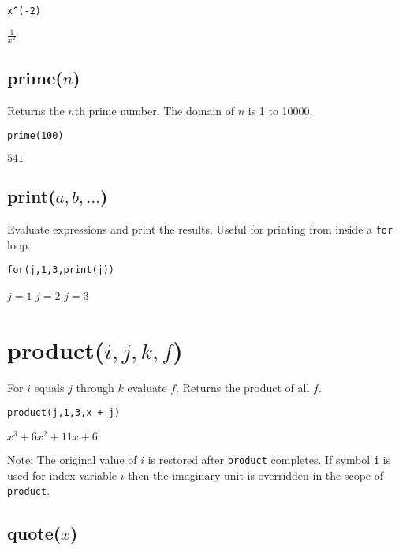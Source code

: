 {\color{blue}
\begin{verbatim}
x^(-2)
\end{verbatim}
}

\noindent
$\displaystyle \frac{1}{x^2}$

\subsection*{prime($n$)}

Returns the $n$th prime number.
The domain of $n$ is 1 to 10000.
{\color{blue}
\begin{verbatim}
prime(100)
\end{verbatim}
}

\noindent
$541$

\subsection*{print($a,b,\ldots$)}

Evaluate expressions and print the results.
Useful for printing from inside a {\tt for} loop.

{\color{blue}
\begin{verbatim}
for(j,1,3,print(j))
\end{verbatim}
}

\noindent
$j=1$\newline
$j=2$\newline
$j=3$

\section*{product($i,j,k,f$)}

For $i$ equals $j$ through $k$ evaluate $f$.
Returns the product of all $f$.

{\color{blue}
\begin{verbatim}
product(j,1,3,x + j)
\end{verbatim}
}

\noindent
$\displaystyle x^3+6x^2+11x+6$

\bigskip
\noindent
Note: The original value of $i$ is restored after {\tt product} completes.
If symbol {\tt i} is used for index variable $i$
then the imaginary unit is overridden in the scope of {\tt product}.

\subsection*{quote($x$)}

